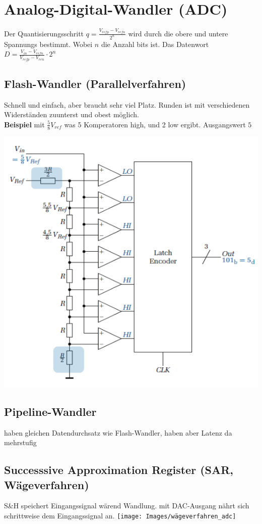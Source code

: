 \section{Analog-Digital-Wandler (ADC)}
Der Quantisierungsschritt $q = \frac{V_{refp} - V_{refn}}{2^n}$ wird durch die obere und untere Spannungs bestimmt. Wobei $n$ die Anzahl bits ist. Das Datenwort $D = \frac{V_{in} - V_{refn}}{V_{refp} - V_{ren}}\cdot 2^n$
\subsection{Flash-Wandler (Parallelverfahren)}
Schnell und einfach, aber braucht sehr viel Platz. Runden ist mit verschiedenen Widerständen zuunterst und obest möglich.\\

\textbf{Beispiel} mit $\frac{5}{8}V_{ref}$ was 5 Komperatoren high, und 2 low ergibt. Ausgangswert $5$
\begin{center}
	\includegraphics[width=0.6\columnwidth]{Images/adc_parallel}
\end{center}


\subsection{Pipeline-Wandler}
haben gleichen Datendurchsatz wie Flash-Wandler, haben aber Latenz da mehrstufig

\subsection{Successsive Approximation Register (SAR, Wägeverfahren)}
S\&H speichert Eingangssignal wärend Wandlung. mit DAC-Ausgang nährt sich schrittweise dem Eingangssignal an.
\texttt{[image: Images/wägeverfahren\_adc]}

